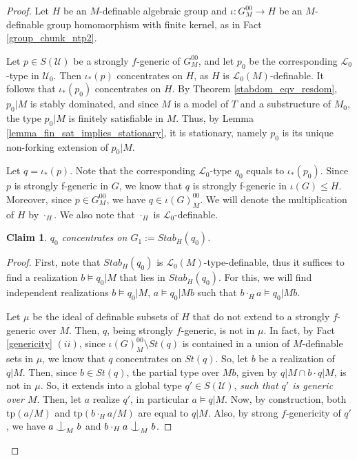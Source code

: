 \documentclass[12pt]{article}
\newcommand{\tpp}{\mathrm{tp}}
\newcommand{\0}{\emptyset}
\newcommand{\U}{\mathcal{U}}
\newcommand{\Ualg}{\mathcal{U}_0}
\def\forkindep{\mathrel{\raise0.2ex\hbox{\ooalign{\hidewidth$\vert$\hidewidth\cr\raise-0.9ex\hbox{$\smile$}}}}}
\theoremstyle{plain}%
\newtheorem{claim}{Claim}
\theoremstyle{definition}
\theoremstyle{remark}
\begin{document}
\begin{proof}
\setcounter{claim}{0}
   Let $H$ be an $M$-definable algebraic group and $\iota:G_M^{00}\to H$ be an $M$-definable group homomorphism with finite kernel, as in Fact \ref{group_chunk_ntp2}. 

  Let $p \in S(\U)$ be a strongly $f$-generic of $G_M^{00}$, %
  and let $p_0$ be the corresponding $\mathcal{L}_0$-type in $\Ualg$. Then $\iota_* (p)$ concentrates on $H$, as $H$ is $\mathcal{L}_0(M)$-definable. It follows that $\iota_* (p_0)$ concentrates on $H$. By Theorem \ref{stabdom_eqv_resdom}, $p_0|M$ is stably dominated, and since $M$ is a model of $T$ and a substructure of $M_0$, the type $p_0|M$ is finitely satisfiable in $M$. Thus, by Lemma \ref{lemma_fin_sat_implies_stationary}, it is stationary, namely $p_0$ is its unique non-forking extension of $p_0|M$. 
  
  Let $q=\iota_{*} (p)$. Note that the corresponding $\mathcal{L}_0$-type $q_0$ equals to $\iota_{*} (p_0)$. Since $p$ is strongly f-generic in $G$, we know that $q$ is strongly f-generic in $\iota(G) \leq H$. Moreover, since $p \in G^{00}_M$, we have $q \in \iota(G)^{00}_M$. We will denote the multiplication of $H$ by $\cdot_H$. We also note that $\cdot_H$ is $\mathcal{L}_0$-definable.
    \begin{claim}\label{claim1_homres} $q_0$ concentrates on $G_1:=Stab_H(q_0)$.
 \end{claim}
    \begin{proof}
First, note that $Stab_H(q_0)$ is $\mathcal{L}_0(M)$-type-definable, thus it suffices to find a realization $b\models q_0|M$ that lies in $ Stab_H(q_0)$. For this, we will find independent realizations $b\models q_0|M$, $a\models q_0|Mb$ such that $b\cdot_{H} a \models q_0|Mb$. 


Let $\mu$ be the ideal of definable subsets of $H$ that do not extend to a strongly $f$-generic over $M$. Then, $q$, being strongly $f$-generic, is not in $\mu$. 
In fact, by Fact \ref{genericity} $(ii)$, since $\iota(G)^{00}_M \setminus St(q)$ is contained in a union of $M$-definable sets in $\mu$, we know that $q$ concentrates on $St(q)$. 
So, let $b$ be a realization of $q |M$. 
Then, since $b \in St(q)$, the partial type over $Mb$, given by $q |M \cap b \cdot q|M$, is not in $\mu$. So, it extends into a global type $q' \in S(\U)$, \emph{such that $q'$ is generic over $M$}. Then, let $a$ realize $q'$, in particular $a \models q|M$. Now, by construction, both $\tpp(a/M)$ and $\tpp(b \cdot_H a/M)$ are equal to $q|M$. 
Also, by strong $f$-genericity of $q'$, we have $a \forkindep_M b$ and $b \cdot_H a \forkindep_M b$. 


\end{proof}
\end{proof}
\end{document}
